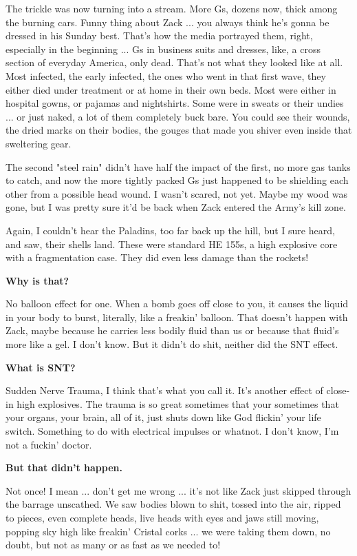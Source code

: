 \documentclass[10pt,a5paper,twoside]{book}
\begin{document}
The trickle was now turning into a stream. More Gs, dozens now, thick among the burning cars. Funny thing about Zack ... you always think he's gonna be dressed in his Sunday best. That's how the media portrayed them, right, especially in the beginning ... Gs in business suits and dresses, like, a cross section of everyday America, only dead. That's not what they looked like at all. Most infected, the early infected, the ones who went in that first wave, they either died under treatment or at home in their own beds. Most were either in hospital gowns, or pajamas and nightshirts. Some were in sweats or their undies ... or just naked, a lot of them completely buck bare. You could see their wounds, the dried marks on their bodies, the gouges that made you shiver even inside that sweltering gear.

The second "steel rain" didn't have half the impact of the first, no more gas tanks to catch, and now the more tightly packed Gs just happened to be shielding each other from a possible head wound. I wasn't scared, not yet. Maybe my wood was gone, but I was pretty sure it'd be back when Zack entered the Army's kill zone.

Again, I couldn't hear the Paladins, too far back up the hill, but I sure heard, and saw, their shells land. These were standard HE 155s, a high explosive core with a fragmentation case. They did even less damage than the rockets!

\textbf{Why is that?}

No balloon effect for one. When a bomb goes off close to you, it causes the liquid in your body to burst, literally, like a freakin' balloon. That doesn't happen with Zack, maybe because he carries less bodily fluid than us or because that fluid's more like a gel. I don't know. But it didn't do shit, neither did the SNT effect.

\textbf{What is SNT?}

Sudden Nerve Trauma, I think that's what you call it. It's another effect of close-in high explosives. The trauma is so great sometimes that your sometimes that your organs, your brain, all of it, just shuts down like God flickin' your life switch. Something to do with electrical impulses or whatnot. I don't know, I'm not a fuckin' doctor.

\textbf{But that didn't happen.}

Not once! I mean ... don't get me wrong ... it's not like Zack just skipped through the barrage unscathed. We saw bodies blown to shit, tossed into the air, ripped to pieces, even complete heads, live heads with eyes and jaws still moving, popping sky high like freakin' Cristal corks ... we were taking them down, no doubt, but not as many or as fast as we needed to!
\end{document}
